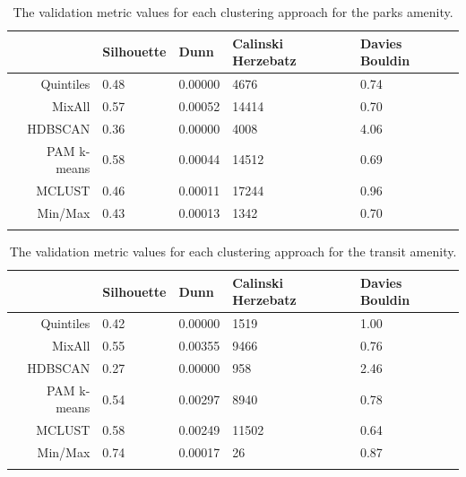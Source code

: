 \documentclass[11pt, a4paper]{article}
\begin{document}
\centering
\begin{longtable}[H]{|r|llll|}
  \hline
 & Silhouette & Dunn & Calinski Herzebatz & Davies Bouldin \\ 
  \hline
Quintiles & 0.48 & 0.00000 &  4676 & 0.74 \\ 
   \hline
MixAll & 0.57 & 0.00052 & 14414 & 0.70 \\ 
   \hline
HDBSCAN & 0.36 & 0.00000 &  4008 & 4.06 \\ 
   \hline
PAM k-means & 0.58 & 0.00044 & 14512 & 0.69 \\ 
   \hline
MCLUST & 0.46 & 0.00011 & 17244 & 0.96 \\ 
   \hline
Min/Max & 0.43 & 0.00013 &  1342 & 0.70 \\ 
   \hline
\caption[Parks validation metrics]{The validation metric values for each clustering approach for the parks amenity.}\label{parksvalid}
\end{longtable}









\centering
\begin{longtable}[H]{|r|llll|}
  \hline
 & Silhouette & Dunn & Calinski Herzebatz & Davies Bouldin \\ 
  \hline
Quintiles & 0.42 & 0.00000 &  1519 & 1.00 \\ 
   \hline
MixAll & 0.55 & 0.00355 &  9466 & 0.76 \\ 
   \hline
HDBSCAN & 0.27 & 0.00000 &   958 & 2.46 \\ 
   \hline
PAM k-means & 0.54 & 0.00297 &  8940 & 0.78 \\ 
   \hline
MCLUST & 0.58 & 0.00249 & 11502 & 0.64 \\ 
   \hline
Min/Max & 0.74 & 0.00017 &    26 & 0.87 \\ 
   \hline
\caption[Transit validation metrics]{The validation metric values for each clustering approach for the transit amenity.}\label{transitvalid}
\end{longtable}
\end{document}

